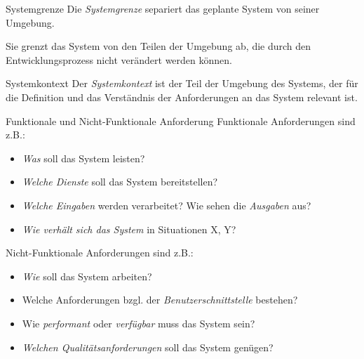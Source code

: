 \begin{defi}{Systemgrenze}
    Die \emph{Systemgrenze} separiert das geplante System von seiner Umgebung.

    Sie grenzt das System von den Teilen der Umgebung ab, die durch den Entwicklungsprozess nicht verändert werden können.
\end{defi}

\begin{defi}{Systemkontext}
    Der \emph{Systemkontext} ist der Teil der Umgebung des Systems, der für die Definition und das Verständnis der Anforderungen an das System relevant ist.
\end{defi}

\begin{defi}{Funktionale und Nicht-Funktionale Anforderung}
    Funktionale Anforderungen sind z.B.:
    \begin{itemize}
        \item \emph{Was} soll das System leisten?
        \item \emph{Welche Dienste} soll das System bereitstellen?
        \item \emph{Welche Eingaben} werden verarbeitet? Wie sehen die \emph{Ausgaben} aus?
        \item \emph{Wie verhält sich das System} in Situationen X, Y?
    \end{itemize}

    Nicht-Funktionale Anforderungen sind z.B.:
    \begin{itemize}
        \item \emph{Wie} soll das System arbeiten?
        \item Welche Anforderungen bzgl. der \emph{Benutzerschnittstelle} bestehen?
        \item Wie \emph{performant} oder \emph{verfügbar} muss das System sein?
        \item \emph{Welchen Qualitätsanforderungen} soll das System genügen?
    \end{itemize}
\end{defi}

